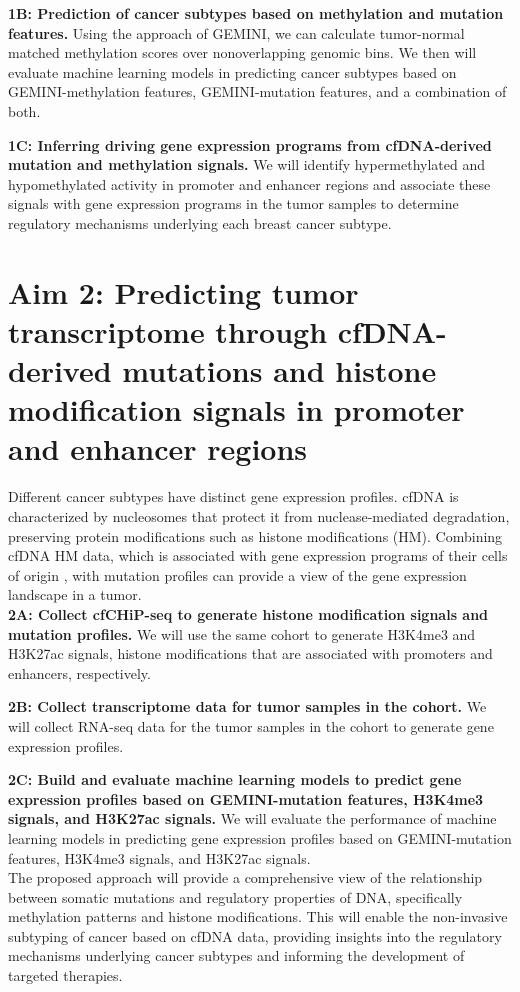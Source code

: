 \documentclass[11pt]{article}
\begin{document}
\noindent \textbf{1B: Prediction of cancer subtypes based on methylation and mutation features.}
Using the approach of GEMINI, we can calculate tumor-normal matched methylation scores over nonoverlapping genomic bins. We then will evaluate machine learning models in predicting cancer subtypes based on GEMINI-methylation features, GEMINI-mutation features, and a combination of both.

\noindent \textbf{1C: Inferring driving gene expression programs from cfDNA-derived mutation and methylation signals.}
We will identify hypermethylated and hypomethylated activity in promoter and enhancer regions and associate these signals with gene expression programs in the tumor samples to determine regulatory mechanisms underlying each breast cancer subtype.
\section*{Aim 2: Predicting tumor transcriptome through cfDNA-derived mutations and histone modification signals in promoter and enhancer regions}
Different cancer subtypes have distinct gene expression profiles. cfDNA is characterized by nucleosomes that protect it from nuclease-mediated degradation, preserving protein modifications such as histone modifications (HM). Combining cfDNA HM data, which is associated with gene expression programs of their cells of origin \cite{sadeh_chip-seq_2021, trier_maansson_cell-free_2023, baca_liquid_2023}, with mutation profiles can provide a view of the gene expression landscape in a tumor.
\medskip \\
\noindent \textbf{2A: Collect cfCHiP-seq \cite{baca_liquid_2023} to generate histone modification signals and mutation profiles.} We will use the same cohort to generate H3K4me3 and H3K27ac signals, histone modifications that are associated with promoters and enhancers, respectively.

\noindent \textbf{2B: Collect transcriptome data for tumor samples in the cohort.} We will collect RNA-seq data for the tumor samples in the cohort to generate gene expression profiles.

\noindent \textbf{2C: Build and evaluate machine learning models to predict gene expression profiles based on GEMINI-mutation features, H3K4me3 signals, and H3K27ac signals.} We will evaluate the performance of machine learning models in predicting gene expression profiles based on GEMINI-mutation features, H3K4me3 signals, and H3K27ac signals. 
\medskip \\
\noindent The proposed approach will provide a comprehensive view of the relationship between somatic mutations and regulatory properties of DNA, specifically methylation patterns and histone modifications. This will enable the non-invasive subtyping of cancer based on cfDNA data, providing insights into the regulatory mechanisms underlying cancer subtypes and informing the development of targeted therapies.
\end{document}
